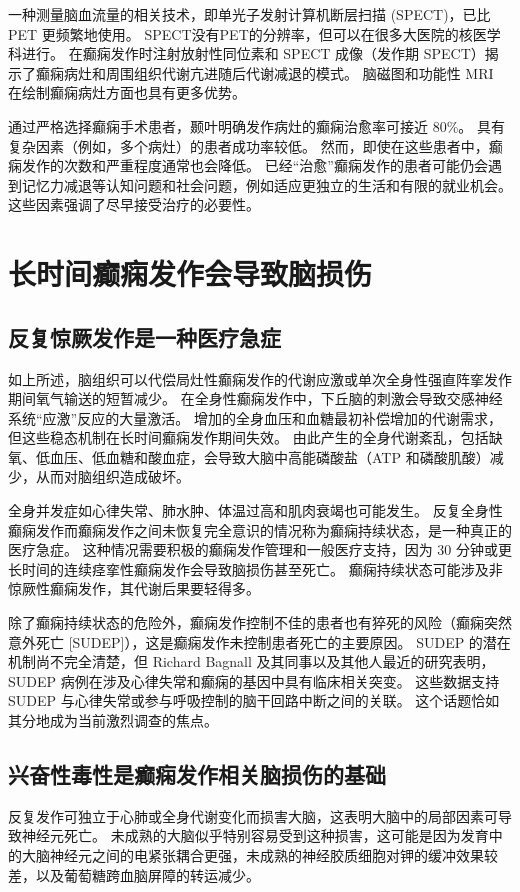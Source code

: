 一种测量脑血流量的相关技术，即单光子发射计算机断层扫描 (SPECT)，已比 PET 更频繁地使用。 SPECT没有PET的分辨率，但可以在很多大医院的核医学科进行。 在癫痫发作时注射放射性同位素和 SPECT 成像（发作期 SPECT）揭示了癫痫病灶和周围组织代谢亢进随后代谢减退的模式。 脑磁图和功能性 MRI 在绘制癫痫病灶方面也具有更多优势。

通过严格选择癫痫手术患者，颞叶明确发作病灶的癫痫治愈率可接近 80\%。 具有复杂因素（例如，多个病灶）的患者成功率较低。 然而，即使在这些患者中，癫痫发作的次数和严重程度通常也会降低。 已经“治愈”癫痫发作的患者可能仍会遇到记忆力减退等认知问题和社会问题，例如适应更独立的生活和有限的就业机会。 这些因素强调了尽早接受治疗的必要性。


\section{长时间癫痫发作会导致脑损伤}
\subsection{反复惊厥发作是一种医疗急症}
如上所述，脑组织可以代偿局灶性癫痫发作的代谢应激或单次全身性强直阵挛发作期间氧气输送的短暂减少。 在全身性癫痫发作中，下丘脑的刺激会导致交感神经系统“应激”反应的大量激活。 增加的全身血压和血糖最初补偿增加的代谢需求，但这些稳态机制在长时间癫痫发作期间失效。 由此产生的全身代谢紊乱，包括缺氧、低血压、低血糖和酸血症，会导致大脑中高能磷酸盐（ATP 和磷酸肌酸）减少，从而对脑组织造成破坏。

全身并发症如心律失常、肺水肿、体温过高和肌肉衰竭也可能发生。 反复全身性癫痫发作而癫痫发作之间未恢复完全意识的情况称为癫痫持续状态，是一种真正的医疗急症。 这种情况需要积极的癫痫发作管理和一般医疗支持，因为 30 分钟或更长时间的连续痉挛性癫痫发作会导致脑损伤甚至死亡。 癫痫持续状态可能涉及非惊厥性癫痫发作，其代谢后果要轻得多。

除了癫痫持续状态的危险外，癫痫发作控制不佳的患者也有猝死的风险（癫痫突然意外死亡 [SUDEP]），这是癫痫发作未控制患者死亡的主要原因。 SUDEP 的潜在机制尚不完全清楚，但 Richard Bagnall 及其同事以及其他人最近的研究表明，SUDEP 病例在涉及心律失常和癫痫的基因中具有临床相关突变。 这些数据支持 SUDEP 与心律失常或参与呼吸控制的脑干回路中断之间的关联。 这个话题恰如其分地成为当前激烈调查的焦点。

\subsection{兴奋性毒性是癫痫发作相关脑损伤的基础}
反复发作可独立于心肺或全身代谢变化而损害大脑，这表明大脑中的局部因素可导致神经元死亡。 未成熟的大脑似乎特别容易受到这种损害，这可能是因为发育中的大脑神经元之间的电紧张耦合更强，未成熟的神经胶质细胞对钾的缓冲效果较差，以及葡萄糖跨血脑屏障的转运减少。

